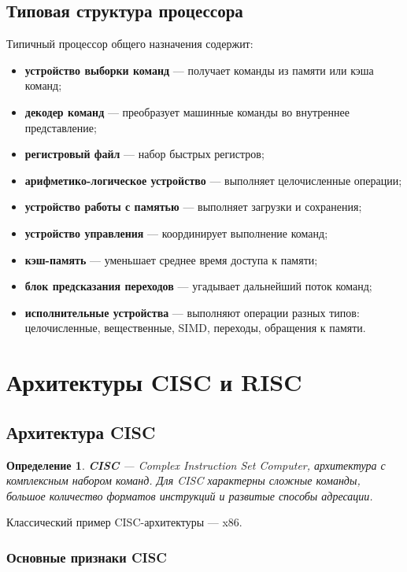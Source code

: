 \documentclass[12pt,a4paper]{article}
\newtheorem{definition}{Определение}
\begin{document}
\subsection{Типовая структура процессора}

Типичный процессор общего назначения содержит:

\begin{itemize}
    \item \textbf{устройство выборки команд} --- получает команды из памяти или кэша команд;
    \item \textbf{декодер команд} --- преобразует машинные команды во внутреннее представление;
    \item \textbf{регистровый файл} --- набор быстрых регистров;
    \item \textbf{арифметико-логическое устройство} --- выполняет целочисленные операции;
    \item \textbf{устройство работы с памятью} --- выполняет загрузки и сохранения;
    \item \textbf{устройство управления} --- координирует выполнение команд;
    \item \textbf{кэш-память} --- уменьшает среднее время доступа к памяти;
    \item \textbf{блок предсказания переходов} --- угадывает дальнейший поток команд;
    \item \textbf{исполнительные устройства} --- выполняют операции разных типов:
    целочисленные, вещественные, SIMD, переходы, обращения к памяти.
\end{itemize}

\section{Архитектуры CISC и RISC}

\subsection{Архитектура CISC}

\begin{definition}
\textbf{CISC} --- Complex Instruction Set Computer, архитектура с комплексным набором команд. Для CISC характерны сложные команды, большое количество форматов инструкций и развитые способы адресации.
\end{definition}

Классический пример CISC-архитектуры --- x86.

\subsubsection{Основные признаки CISC}
\end{document}

